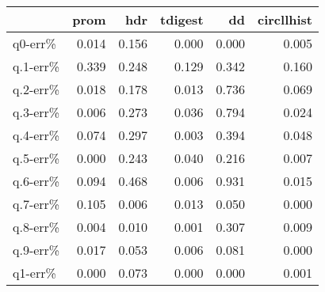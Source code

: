 \begin{tabular}{lrrrrr}
\toprule
{} &  prom &   hdr &  tdigest &    dd &  circllhist \\
\midrule
q0-err\%  & 0.014 & 0.156 &    0.000 & 0.000 &       0.005 \\
q.1-err\% & 0.339 & 0.248 &    0.129 & 0.342 &       0.160 \\
q.2-err\% & 0.018 & 0.178 &    0.013 & 0.736 &       0.069 \\
q.3-err\% & 0.006 & 0.273 &    0.036 & 0.794 &       0.024 \\
q.4-err\% & 0.074 & 0.297 &    0.003 & 0.394 &       0.048 \\
q.5-err\% & 0.000 & 0.243 &    0.040 & 0.216 &       0.007 \\
q.6-err\% & 0.094 & 0.468 &    0.006 & 0.931 &       0.015 \\
q.7-err\% & 0.105 & 0.006 &    0.013 & 0.050 &       0.000 \\
q.8-err\% & 0.004 & 0.010 &    0.001 & 0.307 &       0.009 \\
q.9-err\% & 0.017 & 0.053 &    0.006 & 0.081 &       0.000 \\
q1-err\%  & 0.000 & 0.073 &    0.000 & 0.000 &       0.001 \\
\bottomrule
\end{tabular}
